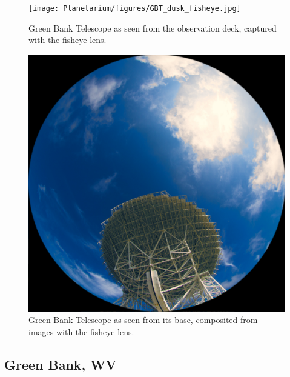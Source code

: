 \begin{figure}[htb]
\centering
\begin{minipage}[b]{0.51\textwidth}
\centering
\texttt{[image: Planetarium/figures/GBT\_dusk\_fisheye.jpg]}
\caption{Green Bank Telescope as seen from the observation deck, captured with the fisheye lens.}
\label{Fig:GBT_dusk_fisheye}
\end{minipage}%
\begin{minipage}[b]{0.02\textwidth}
\hspace{1cm}
\end{minipage}%
\begin{minipage}[b]{0.43\textwidth}
\centering
\includegraphics[width=0.95\linewidth]{Planetarium/figures/GBT_base_render.jpg}
\caption{Green Bank Telescope as seen from its base, composited from images with the fisheye lens.}
\label{Fig:GBT_base_fisheye}
\end{minipage}
\end{figure}


\subsection{Green Bank, WV}

